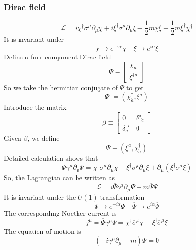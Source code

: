 \documentclass[cyan]{elegantnote}
\begin{document}
\subsubsection{Dirac field}
\[\mathcal{L} = i \chi^{\dagger} \overline{\sigma}^{\mu} \partial_{\mu} \chi + i \xi^{\dagger} \overline{\sigma}^{\mu} \partial_{\mu} \xi- \frac{1}{2}m \chi\xi - \frac{1}{2}m \xi^{\dagger} \chi^{\dagger}\]
It is invariant under
\[\chi \to e^{-i\alpha}\chi \quad \xi \to e^{i\alpha}\xi\]
Define a four-component Dirac field
\[\Psi \equiv \left[ \begin{matrix} \chi_a \\ \xi^{\dagger \dot{a}}\end{matrix} \right] \]
So we take the hermitian conjugate of $\Psi$ to get
\[\Psi^{\dagger} = (\chi^{\dagger}_{\dot{a}}, \xi^{a})\]
Introduce the matrix
\[\beta \equiv \left[ \begin{matrix} 0& \delta^{\dot{a}}_{\phantom{a}\dot{c}}\\ \delta_a^{\phantom{a}c}& 0\end{matrix} \right]\]
Given $\beta$, we define
\[\overline{\Psi} \equiv (\xi^{a},\chi^{\dagger}_{\dot{a}})\]
Detailed calculation shows that
\[\overline{\Psi} \gamma^{\mu} \partial_{\mu} \Psi =  \chi^{\dagger} \overline{\sigma}^{\mu} \partial_{\mu} \chi +  \xi^{\dagger} \overline{\sigma}^{\mu} \partial_{\mu} \xi + \partial_{\mu}( \xi^{\dagger} \sigma^{\mu} \xi)\]
So, the Lagrangian can be written as
\[\mathcal{L} = i\overline{\Psi} \gamma^{\mu} \partial_{\mu} \Psi - m\overline{\Psi}\Psi\]
It is invariant under the $U(1)$ transformation
\[\Psi \to e^{-i\alpha}\Psi \quad \overline{\Psi} \to e^{i\alpha}\overline{\Psi}\]
The corresponding Noether current is
\[j^{\mu} = \overline{\Psi}\gamma^{\mu}\Psi = \chi^{\dagger} \overline{\sigma}^{\mu}  \chi -  \xi^{\dagger} \overline{\sigma}^{\mu} \xi\]
The equation of motion is
\[(-i\gamma^{\mu}\partial_{\mu}+m)\Psi=0\]
\end{document}
